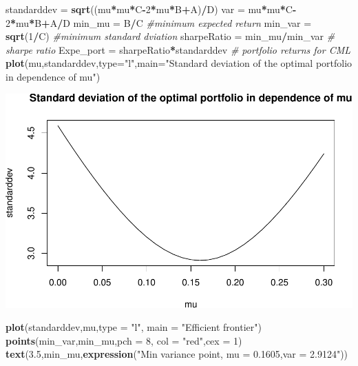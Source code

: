 \documentclass[]{article}
\newenvironment{Shaded}{\begin{snugshade}}{\end{snugshade}}
\newcommand{\KeywordTok}[1]{\textcolor[rgb]{0.13,0.29,0.53}{\textbf{#1}}}
\newcommand{\DataTypeTok}[1]{\textcolor[rgb]{0.13,0.29,0.53}{#1}}
\newcommand{\DecValTok}[1]{\textcolor[rgb]{0.00,0.00,0.81}{#1}}
\newcommand{\FloatTok}[1]{\textcolor[rgb]{0.00,0.00,0.81}{#1}}
\newcommand{\StringTok}[1]{\textcolor[rgb]{0.31,0.60,0.02}{#1}}
\newcommand{\CommentTok}[1]{\textcolor[rgb]{0.56,0.35,0.01}{\textit{#1}}}
\newcommand{\OperatorTok}[1]{\textcolor[rgb]{0.81,0.36,0.00}{\textbf{#1}}}
\newcommand{\NormalTok}[1]{#1}
\begin{document}
\begin{Shaded}
\begin{Highlighting}[]
\NormalTok{standarddev =}\StringTok{ }\KeywordTok{sqrt}\NormalTok{((mu}\OperatorTok{*}\NormalTok{mu}\OperatorTok{*}\NormalTok{C}\OperatorTok{-}\DecValTok{2}\OperatorTok{*}\NormalTok{mu}\OperatorTok{*}\NormalTok{B}\OperatorTok{+}\NormalTok{A)}\OperatorTok{/}\NormalTok{D)}
\NormalTok{var =}\StringTok{ }\NormalTok{mu}\OperatorTok{*}\NormalTok{mu}\OperatorTok{*}\NormalTok{C}\OperatorTok{-}\DecValTok{2}\OperatorTok{*}\NormalTok{mu}\OperatorTok{*}\NormalTok{B}\OperatorTok{+}\NormalTok{A}\OperatorTok{/}\NormalTok{D}
\NormalTok{min_mu =}\StringTok{ }\NormalTok{B}\OperatorTok{/}\NormalTok{C }\CommentTok{#minimum expected return}
\NormalTok{min_var =}\StringTok{ }\KeywordTok{sqrt}\NormalTok{(}\DecValTok{1}\OperatorTok{/}\NormalTok{C) }\CommentTok{#minimum standard dviation}
\NormalTok{sharpeRatio =}\StringTok{ }\NormalTok{min_mu}\OperatorTok{/}\NormalTok{min_var }\CommentTok{# sharpe ratio}
\NormalTok{Expe_port =}\StringTok{ }\NormalTok{sharpeRatio}\OperatorTok{*}\NormalTok{standarddev }\CommentTok{# portfolio returns for CML}
\KeywordTok{plot}\NormalTok{(mu,standarddev,}\DataTypeTok{type=}\StringTok{"l"}\NormalTok{,}\DataTypeTok{main=}\StringTok{"Standard deviation of the optimal portfolio in dependence of mu"}\NormalTok{)}
\end{Highlighting}
\end{Shaded}

\includegraphics{Markowitz_Research_Me_files/figure-latex/unnamed-chunk-17-1.pdf}

\begin{Shaded}
\begin{Highlighting}[]
\KeywordTok{plot}\NormalTok{(standarddev,mu,}\DataTypeTok{type =} \StringTok{"l"}\NormalTok{, }\DataTypeTok{main =} \StringTok{"Efficient frontier"}\NormalTok{)}
\KeywordTok{points}\NormalTok{(min_var,min_mu,}\DataTypeTok{pch =} \DecValTok{8}\NormalTok{, }\DataTypeTok{col =} \StringTok{"red"}\NormalTok{,}\DataTypeTok{cex =} \DecValTok{1}\NormalTok{)}
\KeywordTok{text}\NormalTok{(}\FloatTok{3.5}\NormalTok{,min_mu,}\KeywordTok{expression}\NormalTok{(}\StringTok{"Min variance point, mu = 0.1605,var = 2.9124"}\NormalTok{))}
\end{Highlighting}
\end{Shaded}
\end{document}
